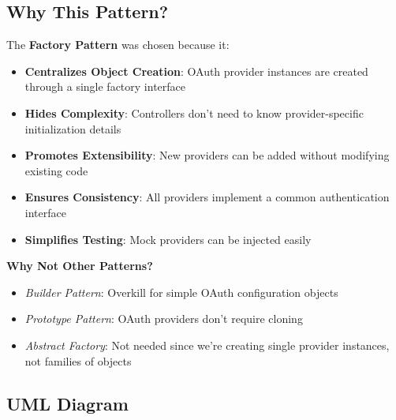 \documentclass[a4paper,12pt]{report}
\begin{document}
\subsection{Why This Pattern?}

The \textbf{Factory Pattern} was chosen because it:

\begin{itemize}
    \item \textbf{Centralizes Object Creation}: OAuth provider instances are created through a single factory interface
    \item \textbf{Hides Complexity}: Controllers don't need to know provider-specific initialization details
    \item \textbf{Promotes Extensibility}: New providers can be added without modifying existing code
    \item \textbf{Ensures Consistency}: All providers implement a common authentication interface
    \item \textbf{Simplifies Testing}: Mock providers can be injected easily
\end{itemize}

\textbf{Why Not Other Patterns?}
\begin{itemize}
    \item \textit{Builder Pattern}: Overkill for simple OAuth configuration objects
    \item \textit{Prototype Pattern}: OAuth providers don't require cloning
    \item \textit{Abstract Factory}: Not needed since we're creating single provider instances, not families of objects
\end{itemize}

\subsection{UML Diagram}
\end{document}
